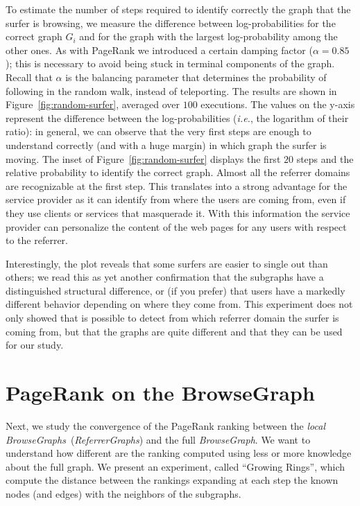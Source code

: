 \documentclass{sig-alternate-2013}
\newcommand{\ie}{\emph{i.e.}}
\newcommand{\rgraphs}{\textit{ReferrerGraphs}}
\newcommand{\bgraph}{\textit{BrowseGraph}}
\newcommand{\bgraphs}{\textit{BrowseGraphs}}
\begin{document}
To estimate the number of steps required to identify correctly the graph that
the surfer is browsing, we measure the difference between log-probabilities for
the correct graph $G_i$ and for the graph with the largest log-probability among the
other ones.
As with PageRank we introduced a certain damping factor
($\alpha=0.85$); this is necessary to avoid being stuck in terminal components
of the graph. Recall that $\alpha$ is the balancing parameter that determines
the probability of following in the random walk, instead of teleporting. The
results are shown in Figure~\ref{fig:random-surfer}, averaged over $100$ executions. 
% 
The values on the y-axis represent the difference between the log-probabilities 
(\ie, the logarithm of their ratio): in general, we can observe that
the very first steps are enough to understand correctly (and with a huge margin) in which
graph the surfer is moving. The inset of Figure~\ref{fig:random-surfer} displays
the first $20$ steps and the relative probability to identify the correct graph.
Almost all the referrer domains are recognizable at the first step. This translates into a strong advantage for the service provider as it can identify from where the users are coming from, even if they use clients or services that masquerade it. With this information the service provider can personalize the content of the web pages for any users with respect to the referrer.

Interestingly, the plot reveals that some surfers are
easier to single out than others; we read this as yet another confirmation that
the subgraphs have a distinguished structural difference, or (if you prefer) that
users have a markedly different behavior depending on where they come from.
This experiment does not only showed that is possible to detect from which referrer domain the surfer is coming from, but that the graphs are quite different and that they can be used for our study.


\section{PageRank on the BrowseGraph} \label{sec:lrp-analysis} 
Next, we study the convergence of the PageRank ranking between the \emph{local} \bgraphs\ (\rgraphs) and the full \bgraph. We want to understand how different are the ranking computed using less or more knowledge about the full graph. We present an experiment, called ``Growing Rings'', which compute the distance between the rankings expanding at each step the known nodes (and edges) with the neighbors of the subgraphs.
\end{document}
